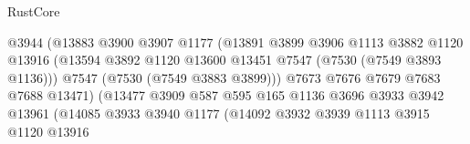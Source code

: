 \begin{lexlean}{RustCore}
\begin{coremodule}
                                            @3944
                                            (@13883
                                              @3900
                                              @3907
                                              @1177
                                              (@13891
                                                @3899
                                                @3906
                                                @1113
                                                @3882
                                                @1120
                                                @13916
                                                (@13594
                                                  @3892
                                                  @1120
                                                  @13600
                                                  @13451
                                                  @7547
                                                  (@7530 (@7549 @3893 @1136)))
                                                @7547
                                                (@7530 (@7549 @3883 @3899)))
                                              @7673
                                              @7676
                                              @7679
                                              @7683
                                              @7688
                                              @13471)
                                            (@13477
                                              @3909
                                              @587
                                              @595
                                              @165
                                              @1136
                                              @3696
                                              @3933
                                              @3942
                                              @13961
                                              (@14085
                                                @3933
                                                @3940
                                                @1177
                                                (@14092
                                                  @3932
                                                  @3939
                                                  @1113
                                                  @3915
                                                  @1120
                                                  @13916

\end{coremodule}
\end{lexlean}
